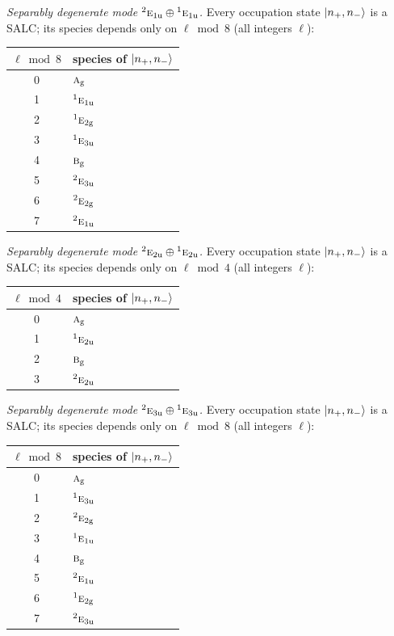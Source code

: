 \documentclass[11pt]{article}
\newcommand{\irr}[1]{\text{\normalfont\scshape #1}}
\newcommand{\conjpair}[1]{{}^{#1}}
\newcommand{\ptag}[1]{\mathrm{#1}}
\begin{document}
\emph{Separably degenerate mode $\conjpair{2}\irr{e}_{1\ptag{u}}\oplus \conjpair{1}\irr{e}_{1\ptag{u}}$.} Every occupation state $\ket{n_+,n_-}$ is a SALC; its species depends only on $\ell\bmod 8$ (all integers $\ell$):
\begin{longtable}{c l}\hline $\ell\bmod 8$ & species of $\ket{n_+,n_-}$\\ \hline\endhead
0 & $\irr{a}_{\ptag{g}}$\\
1 & $\conjpair{1}\irr{e}_{1\ptag{u}}$\\
2 & $\conjpair{1}\irr{e}_{2\ptag{g}}$\\
3 & $\conjpair{1}\irr{e}_{3\ptag{u}}$\\
4 & $\irr{b}_{\ptag{g}}$\\
5 & $\conjpair{2}\irr{e}_{3\ptag{u}}$\\
6 & $\conjpair{2}\irr{e}_{2\ptag{g}}$\\
7 & $\conjpair{2}\irr{e}_{1\ptag{u}}$\\
\hline\end{longtable}

\emph{Separably degenerate mode $\conjpair{2}\irr{e}_{2\ptag{u}}\oplus \conjpair{1}\irr{e}_{2\ptag{u}}$.} Every occupation state $\ket{n_+,n_-}$ is a SALC; its species depends only on $\ell\bmod 4$ (all integers $\ell$):
\begin{longtable}{c l}\hline $\ell\bmod 4$ & species of $\ket{n_+,n_-}$\\ \hline\endhead
0 & $\irr{a}_{\ptag{g}}$\\
1 & $\conjpair{1}\irr{e}_{2\ptag{u}}$\\
2 & $\irr{b}_{\ptag{g}}$\\
3 & $\conjpair{2}\irr{e}_{2\ptag{u}}$\\
\hline\end{longtable}

\emph{Separably degenerate mode $\conjpair{2}\irr{e}_{3\ptag{u}}\oplus \conjpair{1}\irr{e}_{3\ptag{u}}$.} Every occupation state $\ket{n_+,n_-}$ is a SALC; its species depends only on $\ell\bmod 8$ (all integers $\ell$):
\begin{longtable}{c l}\hline $\ell\bmod 8$ & species of $\ket{n_+,n_-}$\\ \hline\endhead
0 & $\irr{a}_{\ptag{g}}$\\
1 & $\conjpair{1}\irr{e}_{3\ptag{u}}$\\
2 & $\conjpair{2}\irr{e}_{2\ptag{g}}$\\
3 & $\conjpair{1}\irr{e}_{1\ptag{u}}$\\
4 & $\irr{b}_{\ptag{g}}$\\
5 & $\conjpair{2}\irr{e}_{1\ptag{u}}$\\
6 & $\conjpair{1}\irr{e}_{2\ptag{g}}$\\
7 & $\conjpair{2}\irr{e}_{3\ptag{u}}$\\
\hline\end{longtable}
\end{document}
